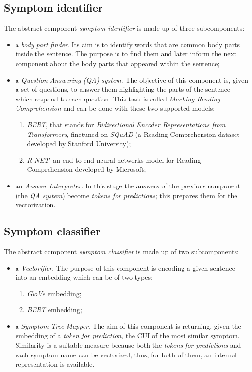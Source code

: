 \subsection{Symptom identifier}
The abstract component \textit{symptom identifier} is made up of three subcomponents:
\begin{itemize}
  \item a \textit{body part finder}. Its aim is to identify words that are common body parts inside the sentence. The purpose is to find them and later inform the next component about the body parts that appeared within the sentence;
  \item a \textit{Question-Answering (QA) system}. The objective of this component is, given a set of questions, to answer them highlighting the parts of the sentence which respond to each question. This task is called \textit{Maching Reading Comprehension} and can be done with these two supported models:
    \begin{enumerate}
      \item \textit{BERT}, that stands for \textit{Bidirectional Encoder Representations from Transformers}, finetuned on \textit{SQuAD} (a Reading Comprehension dataset developed by Stanford University);
      \item \textit{R-NET}, an end-to-end neural networks model for Reading Comprehension developed by Microsoft;
    \end{enumerate}
  \item an \textit{Answer Interpreter}. In this stage the answers of the previous component (the \textit{QA system}) become \textit{tokens for predictions}; this prepares them for the vectorization.
\end{itemize}

\subsection{Symptom classifier}
The abstract component \textit{symptom classifier} is made up of two subcomponents:
\begin{itemize}
  \item a \textit{Vectorifier}. The purpose of this component is encoding a given sentence into an embedding which can be of two types:
  \begin{enumerate}
    \item \textit{GloVe} embedding;
    \item \textit{BERT} embedding;
  \end{enumerate}
  \item a \textit{Symptom Tree Mapper}. The aim of this component is returning, given the embedding of a \textit{token for prediction}, the CUI of the most similar symptom. Similarity is a suitable measure because both the \textit{tokens for predictions} and each symptom name can be vectorized; thus, for both of them, an internal representation is available.
\end{itemize}

